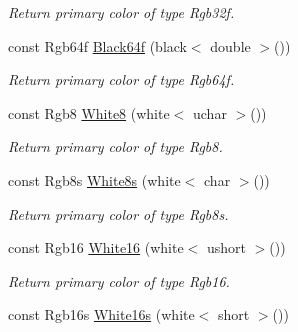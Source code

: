 \begin{DoxyCompactItemize}
\begin{DoxyCompactList}\small\item\em Return primary color of type Rgb32f. \end{DoxyCompactList}\item 
\hypertarget{group___primary_colors_gabfe37c60a3af0a0e46e705df031c90ee}{const Rgb64f \hyperlink{group___primary_colors_gabfe37c60a3af0a0e46e705df031c90ee}{Black64f} (black$<$ double $>$())}\label{group___primary_colors_gabfe37c60a3af0a0e46e705df031c90ee}

\begin{DoxyCompactList}\small\item\em Return primary color of type Rgb64f. \end{DoxyCompactList}\item 
\hypertarget{group___primary_colors_gabfdaaaa9bbe5c6fb8f588e850c0c7747}{const Rgb8 \hyperlink{group___primary_colors_gabfdaaaa9bbe5c6fb8f588e850c0c7747}{White8} (white$<$ uchar $>$())}\label{group___primary_colors_gabfdaaaa9bbe5c6fb8f588e850c0c7747}

\begin{DoxyCompactList}\small\item\em Return primary color of type Rgb8. \end{DoxyCompactList}\item 
\hypertarget{group___primary_colors_ga2be3104e00bf5359d5d3794cadf4ab20}{const Rgb8s \hyperlink{group___primary_colors_ga2be3104e00bf5359d5d3794cadf4ab20}{White8s} (white$<$ char $>$())}\label{group___primary_colors_ga2be3104e00bf5359d5d3794cadf4ab20}

\begin{DoxyCompactList}\small\item\em Return primary color of type Rgb8s. \end{DoxyCompactList}\item 
\hypertarget{group___primary_colors_gaf138bf8941a9023664dd8262d8277ee1}{const Rgb16 \hyperlink{group___primary_colors_gaf138bf8941a9023664dd8262d8277ee1}{White16} (white$<$ ushort $>$())}\label{group___primary_colors_gaf138bf8941a9023664dd8262d8277ee1}

\begin{DoxyCompactList}\small\item\em Return primary color of type Rgb16. \end{DoxyCompactList}\item 
\hypertarget{group___primary_colors_ga96dc78b5ef63b72872a0be12b92f7b24}{const Rgb16s \hyperlink{group___primary_colors_ga96dc78b5ef63b72872a0be12b92f7b24}{White16s} (white$<$ short $>$())}\label{group___primary_colors_ga96dc78b5ef63b72872a0be12b92f7b24}


\end{DoxyCompactItemize}
